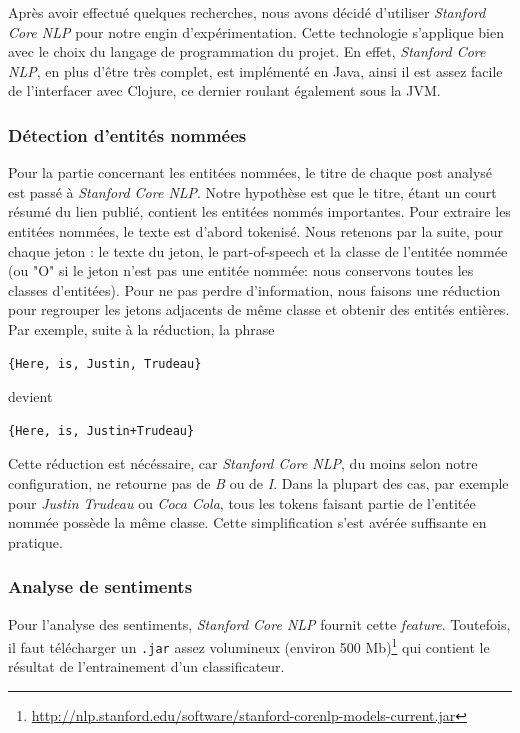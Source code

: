 \documentclass[12pt]{article}
\begin{document}
Après avoir effectué quelques recherches, nous avons décidé d'utiliser \textit{Stanford Core NLP} pour notre engin d'expérimentation. Cette technologie s'applique bien avec le choix du langage de programmation du projet. En effet, \textit{Stanford Core NLP}, en plus d'être très complet, est implémenté en Java, ainsi il est assez facile de l'interfacer avec Clojure, ce dernier roulant également sous la JVM.

\subsubsection{Détection d'entités nommées}
\label{sec:named-entities}

Pour la partie concernant les entitées nommées, le titre de chaque post analysé est passé à \textit{Stanford Core NLP}. Notre hypothèse est que le titre, étant un court
résumé du lien publié, contient les entitées nommés importantes.
Pour extraire les entitées nommées, le texte est d'abord tokenisé. Nous retenons par la suite, pour chaque jeton : le texte du jeton, le part-of-speech et la classe de l'entitée nommée (ou "O" si le jeton n'est pas une entitée nommée: nous conservons toutes les classes d'entitées). Pour ne pas perdre d'information, nous faisons une réduction pour regrouper les jetons adjacents de même classe et obtenir des entités entières. Par exemple, suite à la réduction, la phrase

\begin{verbatim}
{Here, is, Justin, Trudeau}
\end{verbatim}

devient

\begin{verbatim}
{Here, is, Justin+Trudeau}
\end{verbatim}

Cette réduction est nécéssaire, car \textit{Stanford Core NLP}, du moins selon notre configuration, ne retourne pas de \textit{B} ou de \textit{I}.
Dans la plupart des cas, par exemple pour \emph{Justin Trudeau} ou \emph{Coca Cola}, tous les tokens faisant partie de l'entitée nommée possède la même
classe. Cette simplification s'est avérée suffisante en pratique.

\subsubsection{Analyse de sentiments}
\label{sec:sentiment-analysis}

Pour l'analyse des sentiments, \textit{Stanford Core NLP} fournit cette \textit{feature}. Toutefois, il faut télécharger un \verb;.jar; assez volumineux (environ 500 Mb)\footnote{\url{http://nlp.stanford.edu/software/stanford-corenlp-models-current.jar}} qui contient le résultat de l'entrainement d'un classificateur.
\end{document}
